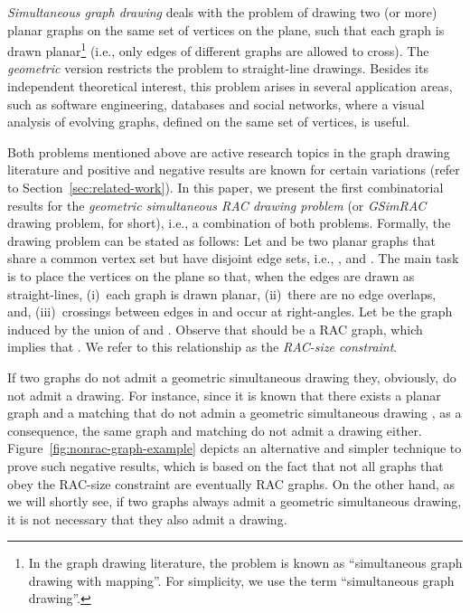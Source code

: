 \documentclass{llncs}
\begin{document}
\emph{Simultaneous graph drawing} deals with the problem of drawing
two (or more) planar graphs on the same set of vertices on the
plane, such that each graph is drawn planar\footnote{In the graph
drawing literature, the problem is known as ``simultaneous graph
drawing with mapping''. For simplicity, we use the term
``simultaneous graph drawing''.} (i.e., only edges of different
graphs are allowed to cross). The \emph{geometric} version restricts
the problem to straight-line drawings. Besides its independent
theoretical interest, this problem arises in several application
areas, such as software engineering, databases and social networks,
where a visual analysis of evolving graphs, defined on the same set
of vertices, is useful.

Both problems mentioned above are active research topics in the
graph drawing literature and positive and negative results are known
for certain variations (refer to Section~\ref{sec:related-work}). In
this paper, we present the first combinatorial results for the
\emph{geometric simultaneous RAC drawing problem} (or \emph{GSimRAC}
drawing problem, for short), i.e., a combination of both problems.
Formally, the  drawing problem can be stated as follows:
Let  and  be two planar graphs that share
a common vertex set but have disjoint edge sets, i.e., ,  and . The main task is to place the vertices on the plane so
that, when the edges are drawn as straight-lines, (i)~each graph is
drawn planar, (ii)~there are no edge overlaps, and, (iii)~crossings
between edges in  and  occur at right-angles. Let  be the graph induced by the union of  and .
Observe that  should be a RAC graph, which implies that  \cite{DEL09}. We refer to this relationship
as the \emph{RAC-size constraint}.

If two graphs do not admit a geometric simultaneous drawing they,
obviously, do not admit a  drawing. For instance, since it
is known that there exists a planar graph and a matching that do not
admin a geometric simultaneous drawing \cite{CvKLMSV11}, as a
consequence, the same graph and matching do not admit a 
drawing either. Figure~\ref{fig:nonrac-graph-example} depicts an
alternative and simpler technique to prove such negative results,
which is based on the fact that not all graphs that obey the
RAC-size constraint are eventually RAC graphs. On the other hand, as
we will shortly see, if two graphs always admit a geometric
simultaneous drawing, it is not necessary that they also admit a
 drawing.
\end{document}
